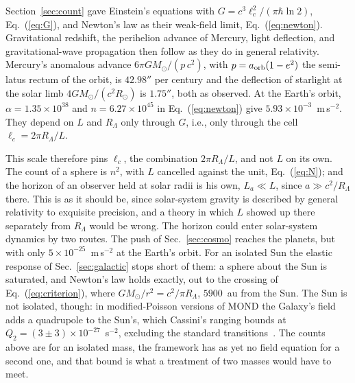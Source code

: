\documentclass[aps,prd,twocolumn,superscriptaddress,nofootinbib,showkeys]{revtex4-2}
\makeatletter
\newcommand{\lc}{\ell_c}
\newcommand{\RL}{R_\Lambda}
\def\subsection{\@startsection{subsection}{2}{\z@}{0.6cm \@plus1ex \@minus .2ex}{0.35cm}{\normalfont\small\bfseries}}
\makeatother
\begin{document}
Section~\ref{sec:count} gave Einstein's equations with $G = c^3\lc^2/(\pi\hbar\ln2)$, Eq.~(\ref{eq:G}), and Newton's law as their weak-field limit, Eq.~(\ref{eq:newton}). Gravitational redshift, the perihelion advance of Mercury, light deflection, and gravitational-wave propagation then follow as they do in general relativity. Mercury's anomalous advance $6\pi GM_\odot/(p\,c^2)$, with $p = a_{\rm orb}(1-e^2)$ the semi-latus rectum of the orbit, is $42.98''$ per century and the deflection of starlight at the solar limb $4GM_\odot/(c^2R_\odot)$ is $1.75''$, both as observed. At the Earth's orbit, $\alpha = 1.35\times10^{38}$ and $n = 6.27\times10^{45}$ in Eq.~(\ref{eq:newton}) give $5.93\times10^{-3}$~m\,s$^{-2}$. They depend on $L$ and $\RL$ only through $G$, i.e., only through the cell $\lc = 2\pi\RL/L$.

This scale therefore pins $\lc$, the combination $2\pi\RL/L$, and not $L$ on its own. The count of a sphere is $n^2$, with $L$ cancelled against the unit, Eq.~(\ref{eq:N}); and the horizon of an observer held at solar radii is his own, $L_a\ll L$, since $a\gg c^2/\RL$ there. This is as it should be, since solar-system gravity is described by general relativity to exquisite precision, and a theory in which $L$ showed up there separately from $\RL$ would be wrong. The horizon could enter solar-system dynamics by two routes. The push of Sec.~\ref{sec:cosmo} reaches the planets, but with only $5\times10^{-25}$~m\,s$^{-2}$ at the Earth's orbit. For an isolated Sun the elastic response of Sec.~\ref{sec:galactic} stops short of them: a sphere about the Sun is saturated, and Newton's law holds exactly, out to the crossing of Eq.~(\ref{eq:criterion}), where $GM_\odot/r^2 = c^2/\pi\RL$, $5900$~au from the Sun. The Sun is not isolated, though: in modified-Poisson versions of MOND the Galaxy's field adds a quadrupole to the Sun's, which Cassini's ranging bounds at $Q_2 = (3\pm3)\times10^{-27}$~s$^{-2}$, excluding the standard transitions~\cite{hees2014}. The counts above are for an isolated mass, the framework has as yet no field equation for a second one, and that bound is what a treatment of two masses would have to meet.

\subsection{Galactic scale: the string}\label{sec:galactic}
\end{document}
